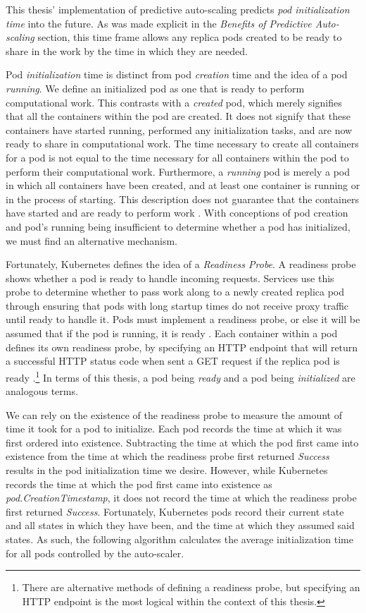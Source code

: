 This thesis' implementation of predictive auto-scaling predicts \textit{pod
initialization time} into the future. As was made explicit in the
\textit{Benefits of Predictive Auto-scaling} section, this time
frame allows any replica pods created to be ready to share in the work by the
time in which they are needed.

Pod \textit{initialization} time is distinct from pod \textit{creation} time and
the idea of a pod \textit{running}. We define an initialized pod as one that is
ready to perform computational work. This contrasts with a \textit{created} pod,
which merely signifies that all the containers within the pod are created. It
does not signify that these containers have started running, performed any
initialization tasks, and are now ready to share in computational work. The time
necessary to create all containers for a pod is not equal to the time necessary
for all containers within the pod to perform their computational work.
Furthermore, a \textit{running} pod is merely a pod in which all containers have
been created, and at least one container is running or in the process of
starting. This description does not guarantee that the containers have started
and are ready to perform work \cite{k8s-pod-states}. With conceptions
of pod creation and pod's
running being insufficient to determine whether a pod has initialized, we must
find an alternative mechanism.

Fortunately, Kubernetes defines the idea of a \textit{Readiness Probe}. A
readiness probe shows whether a pod is ready to handle incoming requests.
Services use this probe to determine whether to pass work along to a newly
created replica pod through ensuring that pods with long startup times do not
receive proxy traffic until ready to handle it. Pods must implement a readiness
probe, or else it will be assumed that if the pod is running, it is ready
\cite{k8s-pod-states}. Each container within a pod defines its own readiness
probe, by specifying an HTTP endpoint that will return a successful HTTP status
code when sent a GET request if the replica pod is ready
\cite{k8s-working-with-containers}.\footnote{There are alternative methods of
defining a readiness probe, but specifying an HTTP endpoint is the most logical
within the context of this thesis.} In terms of this thesis, a
pod being \textit{ready} and a pod being \textit{initialized} are analogous
terms.

We can rely on the existence of the readiness probe to
measure the amount of time it took for a pod
to initialize. Each pod records the time at which it was first ordered into
existence. Subtracting the time at which the pod first came into existence
from the time at which the readiness probe first returned \textit{Success}
results in the pod initialization time we desire. However, while Kubernetes
records the time at which the pod first came into existence as
\textit{pod.CreationTimestamp}, it does not record the time at which the
readiness probe first returned \textit{Success}. Fortunately, Kubernetes pods
record their current state and all states in which they have been, and the time
at which they assumed said states. As such, the following algorithm
calculates the average initialization time for all pods controlled by the auto-scaler.

